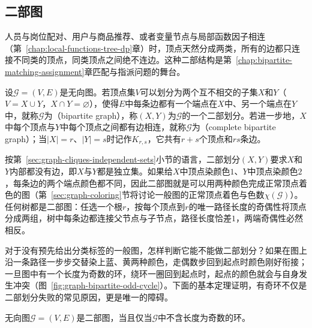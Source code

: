 \subsection{二部图}
\label{sec:graph-bipartite-graphs}

人员与岗位配对、用户与商品推荐、或者变量节点与局部函数因子相连（第~\ref{chap:local-functions-tree-dp}章）时，顶点天然分成两类，所有的边都只连接不同类的顶点，同类顶点之间绝不连边。这种二部结构是第~\ref{chap:bipartite-matching-assignment}章匹配与指派问题的舞台。

\begin{definition}[二部图与完全二部图]
\label{def:graph-bipartite}
设$\mathcal G=(V,E)$是无向图。若顶点集$V$可以划分为两个互不相交的子集$X$和$Y$（$V=X\cup Y$，$X\cap Y=\varnothing$），使得$E$中每条边都有一个端点在$X$中、另一个端点在$Y$中，就称$\mathcal G$为（bipartite graph），称$(X,Y)$为$\mathcal G$的一个二部划分。若进一步地，$X$中每个顶点与$Y$中每个顶点之间都有边相连，就称$\mathcal G$为（complete bipartite graph）；当$|X|=r$、$|Y|=s$时记作$K_{r,s}$，它共有$r+s$个顶点和$rs$条边。
\end{definition}

按第~\ref{sec:graph-cliques-independent-sets}小节的语言，二部划分$(X,Y)$要求$X$和$Y$内部都没有边，即$X$与$Y$都是独立集。如果给$X$中顶点染颜色$1$、$Y$中顶点染颜色$2$，每条边的两个端点颜色都不同，因此二部图就是可以用两种颜色完成正常顶点着色的图（第~\ref{sec:graph-coloring}节将讨论一般图的正常顶点着色与色数$\chi(\mathcal G)$）。任何树都是二部图：任选一个根$r$，按每个顶点到$r$的唯一路径长度的奇偶性将顶点分成两组，树中每条边都连接父节点与子节点，路径长度恰差$1$，两端奇偶性必然相反。

对于没有预先给出分类标签的一般图，怎样判断它能不能做二部划分？如果在图上沿一条路径一步步交替染上蓝、黄两种颜色，走偶数步回到起点时颜色刚好衔接；一旦图中有一个长度为奇数的环，绕环一圈回到起点时，起点的颜色就会与自身发生冲突（图~\ref{fig:graph-bipartite-odd-cycle}）。下面的基本定理证明，有奇环不仅是二部划分失败的常见原因，更是唯一的障碍。

\begin{theorem}[二部图的奇环判别]
\label{thm:graph-bipartite-odd-cycle}
无向图$\mathcal G=(V,E)$是二部图，当且仅当$\mathcal G$中不含长度为奇数的环。
\end{theorem}


